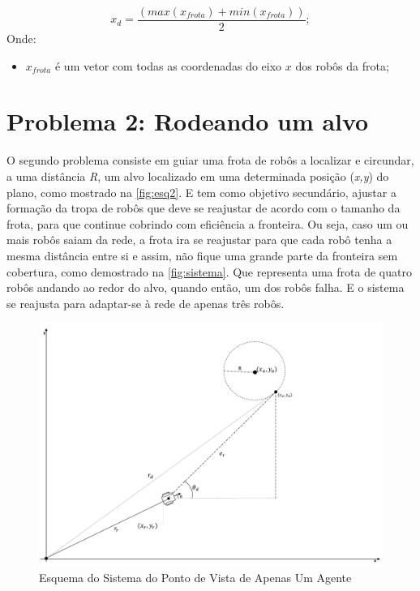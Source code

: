 \begin{equation}
x_{d} = \dfrac{(max(x_{frota}) + min(x_{frota}))}{2};
\label{eq:xdp1}
\end{equation}
Onde:
\begin{itemize}
	\item $x_{frota}$ é um vetor com todas as coordenadas do eixo $x$ dos robôs da frota; 
\end{itemize}

\section{Problema 2: Rodeando um alvo}


O segundo problema consiste em guiar uma frota de robôs a localizar e circundar, a uma distância \emph{R}, um alvo localizado em uma determinada posição (\emph{x,y}) do plano, como mostrado na \autoref{fig:esq2}. E tem como objetivo secundário, ajustar a formação da tropa de robôs que deve se reajustar de acordo com o tamanho da frota, para que continue cobrindo com eficiência a fronteira. Ou seja, caso um ou mais robôs saiam da rede, a frota ira se reajustar para que cada robô tenha a mesma distância entre si e assim, não fique uma grande parte da fronteira sem cobertura, como demostrado na \autoref{fig:sistema}. Que representa uma frota de quatro robôs andando ao redor do alvo, quando então, um dos robôs falha. E o sistema se reajusta para adaptar-se à rede de apenas três robôs.

\begin{figure}[!htb]
	\centering
	\includegraphics[width=1.0\textwidth]{./04-figuras/esqSistema}
	\caption{Esquema do Sistema do Ponto de Vista de Apenas Um Agente}
	\label{fig:esq2}
\end{figure}

